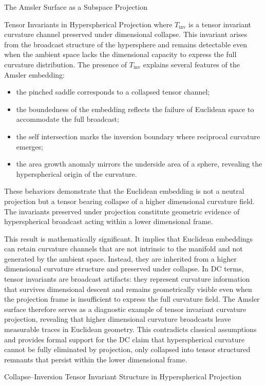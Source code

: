 \documentclass[final,onefignum,onetabnum]{siamart}
\begin{document}
\begin{section}{The Amsler Surface as a Subspace Projection}
\begin{subsection}{Tensor Invariants in Hyperspherical Projection}
where $T_{\mathrm{inv}}$ is a tensor invariant curvature channel preserved under dimensional collapse. This invariant arises from the broadcast structure of the hypersphere and remains detectable even when the ambient space lacks the dimensional capacity to express the full curvature distribution. The presence of $T_{\mathrm{inv}}$ explains several features of the Amsler embedding:

\begin{itemize}
    \item the pinched saddle corresponds to a collapsed tensor channel;
    \item the boundedness of the embedding reflects the failure of Euclidean space to accommodate the full broadcast;
    \item the self intersection marks the inversion boundary where reciprocal curvature emerges;
    \item the area growth anomaly mirrors the underside area of a sphere, revealing the hyperspherical origin of the curvature.
    \end{itemize}
    
These behaviors demonstrate that the Euclidean embedding is not a neutral projection but a tensor bearing collapse of a higher dimensional curvature field. The invariants preserved under projection constitute geometric evidence of hyperspherical broadcast acting within a lower dimensional frame.

This result is mathematically significant. It implies that Euclidean embeddings can retain curvature channels that are not intrinsic to the manifold and not generated by the ambient space. Instead, they are inherited from a higher dimensional curvature structure and preserved under collapse. In DC terms, tensor invariants are broadcast artifacts: they represent curvature information that survives dimensional descent and remains geometrically visible even when the projection frame is insufficient to express the full curvature field. The Amsler surface therefore serves as a diagnostic example of tensor invariant curvature projection, revealing that higher dimensional curvature broadcasts leave measurable traces in Euclidean geometry. This contradicts classical assumptions and provides formal support for the DC claim that hyperspherical curvature cannot be fully eliminated by projection, only collapsed into tensor structured remnants that persist within the lower dimensional frame.
\end{subsection}

\begin{subsection}{Collapse–Inversion Tensor Invariant Structure in Hyperspherical Projection}


\end{subsection}
\end{section}
\end{document}
